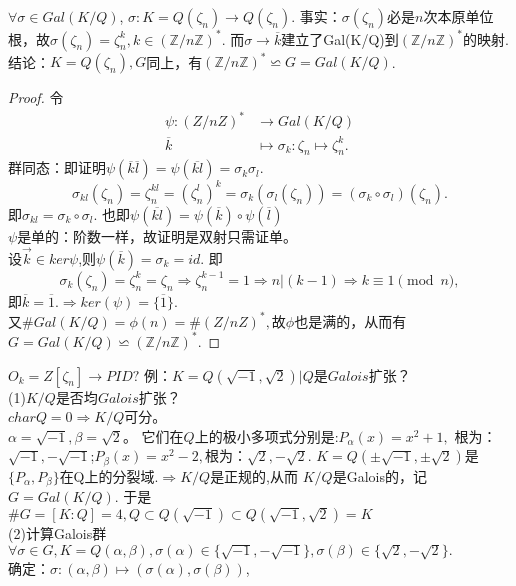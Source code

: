 \documentclass[UTF8]{article}
\begin{document}
$\forall \sigma\in Gal(K/Q)$,
$\sigma:K=Q(\zeta_n)\longrightarrow Q(\zeta_n)$.
事实：$\sigma(\zeta_n)$必是$n$次本原单位根，故$\sigma(\zeta_n)=\zeta_n^k,k\in(\mathbb{Z}/n\mathbb{Z})^{*}$.
而$\sigma \longrightarrow \overline{k}$建立了Gal(K/Q)到$(\mathbb{Z}/n\mathbb{Z})^{*}$的映射.\\
结论：$K=Q(\zeta_n),G$同上，有$(\mathbb{Z}/n\mathbb{Z})^{*}\backsimeq G=Gal(K/Q)$.
\begin{proof}
	令
	\[
	\begin{split}
	\psi:(Z/nZ)^*&\longrightarrow Gal(K/Q)\\
	\overline{k}&\longmapsto \sigma_k:\zeta_n\longmapsto \zeta_n^k.
	\end{split}
	\]
	群同态：即证明$\psi(\overline{k}\overline{l})=\psi(\overline{kl})=\sigma_k\sigma_l.$\\
	$$\sigma_{kl}(\zeta_n)=\zeta_n^{kl}=(\zeta_n^l)^k=\sigma_k(\sigma_l(\zeta_n))=(\sigma_k\circ\sigma_l)(\zeta_n).$$
	即$\sigma_{kl}=\sigma_k\circ\sigma_l.$
	也即$\psi(\overline{kl})=\psi(\overline{k})\circ\psi(\overline{l})$\\
	$\psi$是单的：阶数一样，故证明是双射只需证单。\\
	设$\overrightarrow{k}\in ker\psi$,则$\psi(\overline{k})=\sigma_k=id.$
	即
	$$\sigma_k(\zeta_n)=\zeta_n^k=\zeta_n\Rightarrow \zeta_n^{k-1}=1\Rightarrow n|(k-1)\Rightarrow k\equiv 1\pmod n,$$即$\overline{k}=\overline{1}.\Rightarrow ker(\psi)=\{\overline{1}\}.$\\
	又$\#Gal(K/Q)=\phi(n)=\#(Z/nZ)^*,$故$\phi $也是满的，从而有$G=Gal(K/Q)\backsimeq (\mathbb{Z}/n\mathbb{Z})^{*}$.
\end{proof}
$O_{k}=Z[\zeta_n]\rightarrow PID?$
例：$K=Q(\sqrt{-1},\sqrt{2})|Q$是$Galois$扩张？\\
(1)$K/Q$是否均$Galois$扩张？\\
$charQ=0\Rightarrow K/Q$可分。\\
$\alpha=\sqrt{-1},\beta=\sqrt{2}$。
它们在$Q$上的极小多项式分别是:$P_{\alpha}(x)=x^2+1,$
根为：$\sqrt{-1},-\sqrt{-1}$;$P_{\beta}(x)=x^2-2,$根为：$\sqrt{2},-\sqrt{2}.$ $K=Q(\pm\sqrt{-1},\pm\sqrt{2})$是$\{P_\alpha,P_\beta\}$在Q上的分裂域.$\Rightarrow K/Q$是正规的,从而
$K/Q $是Galois的，记$G=Gal(K/Q).$
于是$\#G=[K:Q]=4,Q\subset Q(\sqrt{-1})\subset Q(\sqrt{-1},\sqrt{2})=K $\\
(2)计算Galois群\\
$\forall \sigma \in G,K=Q(\alpha,\beta),\sigma(\alpha)\in \{\sqrt{-1},-\sqrt{-1}\},\sigma(\beta)\in \{\sqrt{2},-\sqrt{2}\}.$\\
确定：$\sigma:(\alpha,\beta)\longmapsto (\sigma(\alpha),\sigma(\beta))$,
\end{document}
